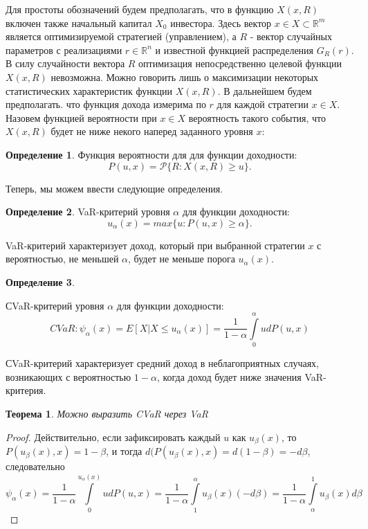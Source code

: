 \documentclass[14pt,a4paper]{article}
\theoremstyle{plain}
\newtheorem{Th}{Теорема}[section]
\theoremstyle{definition}
\newtheorem{Def}{Определение}[section]
\begin{document}
Для простоты обозначений будем предполагать, что в функцию $X(x, R)$ включен также начальный капитал $X_0$ инвестора.
Здесь вектор $x \in X \subset \mathbb{R}^m$ является оптимизируемой стратегией (управлением), а $R$ - вектор случайных параметров с реализациями $r \in \mathbb{R}^n$ и известной функцией распределения $G_R(r)$.
В силу случайности вектора $R$ оптимизация непосредственно целевой функции  $X(x,R)$ невозможна. Можно говорить лишь о максимизации некоторых статистических характеристик функции  $X(x,R)$. В дальнейшем будем предполагать. что функция дохода измерима по $r$ для каждой стратегии $x \in X$.
Назовем функцией вероятности при $x \in X$ вероятность такого события, что $X(x,R)$ будет не ниже некого наперед заданного уровня $x$:
\begin{Def} \label{main}
Функция вероятности для для функции доходности:
$$
P(u,x) =  \mathcal{P}\{R:X(x,R) \ge u\}.
$$
\end{Def}
Теперь, мы можем ввести следующие определения.
\begin{Def} \label{main}
VaR-критерий уровня $\alpha$ для функции доходности:
$$
u_\alpha(x)=max\{u:P(u, x)\ge \alpha\}.
$$
\end{Def}

VaR-критерий характеризует доход, который при выбранной стратегии $x$ с вероятностью, не меньшей $\alpha$, будет не меньше порога $u_\alpha(x)$.


\begin{Def} \label{main}

СVaR-критерий уровня $\alpha$ для функции доходности:
$$
CVaR: \psi_\alpha (x) = E[X | X \le u_\alpha (x)] = \frac{1}{1-\alpha} \int\limits_{0}^{\alpha} u dP(u,x)
$$
\end{Def}

СVaR-критерий характеризует средний доход в неблагоприятных случаях, возникающих с вероятностью $1-\alpha$, когда доход будет ниже значения VaR-критерия.

\begin{Th} \label{main} Можно выразить CVaR через VaR
\end{Th}
\begin{proof}
Действительно, если зафиксировать каждый $u$ как $u_\beta (x)$, то $P(u_\beta (x),x) = 1-\beta$, и тогда $d(P(u_\beta (x),x) = d(1-\beta) =  -d\beta$, следовательно
$$
\psi_\alpha (x) = \frac{1}{1-\alpha} \int\limits_{0}^{u_\alpha (x)} u dP(u,x) = \frac{1}{1-\alpha} \int\limits_{1}^{\alpha} u_\beta (x) (-d\beta) = \frac{1}{1-\alpha} \int \limits_{\alpha}^{1} u_\beta (x) d\beta
$$
\end{proof}
\end{document}
